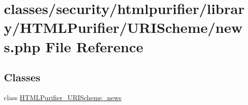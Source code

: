 \hypertarget{news_8php}{\section{classes/security/htmlpurifier/library/\+H\+T\+M\+L\+Purifier/\+U\+R\+I\+Scheme/news.php File Reference}
\label{news_8php}
}
\subsection*{Classes}
\begin{DoxyCompactItemize}
\item 
class \hyperlink{classHTMLPurifier__URIScheme__news}{H\+T\+M\+L\+Purifier\+\_\+\+U\+R\+I\+Scheme\+\_\+news}
\end{DoxyCompactItemize}
